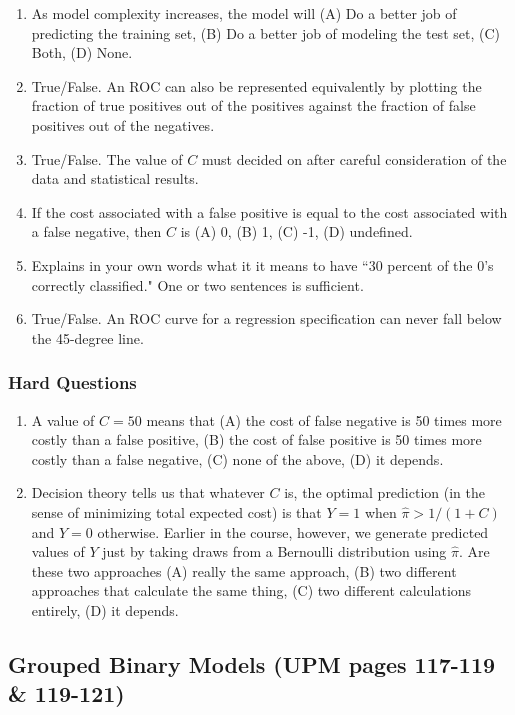 \documentclass[11pt]{article}
\begin{document}
\begin{enumerate}
\item As model complexity increases, the model will (A) Do a better job of predicting the training set, (B) Do a better job of modeling the test set, (C) Both, (D) None.
\item True/False. An ROC can also be represented equivalently by plotting the fraction of true positives out of the positives against the fraction of false positives out of the negatives. 
\item True/False. The value of $C$ must decided on after careful consideration of the data and statistical results.
\item If the cost associated with a false positive is equal to the cost associated with a false negative, then $C$ is (A) 0, (B) 1, (C) -1, (D) undefined. 
\item Explains in your own words what it it means to have ``30 percent of the 0's correctly classified." One or two sentences is sufficient. 
\item True/False.  An ROC curve for a regression specification can never fall below the 45-degree line. 
\end{enumerate}

\subsubsection{Hard Questions}

\begin{enumerate}
\item A value of $C=50$ means that (A) the cost of false negative is 50 times more costly than a false positive, (B) the cost of false positive is 50 times more costly than a false negative, (C) none of the above, (D) it depends.
\item Decision theory tells us that whatever $C$ is, the optimal prediction (in the sense of minimizing total expected	cost) is that $Y= 1$ when $\hat{\pi} > 1/(1+C)$ and $Y= 0$ otherwise. Earlier in the course, however, we generate predicted values of $Y$ just by taking draws from a Bernoulli distribution using $\hat{\pi}$. Are these two approaches (A) really the same approach, (B) two different approaches that calculate the same thing, (C) two different calculations entirely, (D) it depends.
\end{enumerate}

\subsection{Grouped Binary Models (UPM pages 117-119 \& 119-121)}
\end{document}

